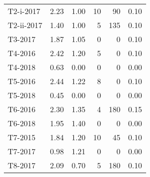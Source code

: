 \begin{tabular}{lrrrrr}
   T2-i-2017 &                2.23 &            1.00 &                 10 &                        90 &                      0.10 \\
  T2-ii-2017 &                1.40 &            1.00 &                  5 &                       135 &                      0.10 \\
     T3-2017 &                1.87 &            1.05 &                  0 &                         0 &                      0.10 \\
     T4-2016 &                2.42 &            1.20 &                  5 &                         0 &                      0.10 \\
     T4-2018 &                0.63 &            0.00 &                  0 &                         0 &                      0.00 \\
     T5-2016 &                2.44 &            1.22 &                  8 &                         0 &                      0.10 \\
     T5-2018 &                0.45 &            0.00 &                  0 &                         0 &                      0.00 \\
     T6-2016 &                2.30 &            1.35 &                  4 &                       180 &                      0.15 \\
     T6-2018 &                1.95 &            1.40 &                  0 &                         0 &                      0.00 \\
     T7-2015 &                1.84 &            1.20 &                 10 &                        45 &                      0.10 \\
     T7-2017 &                0.98 &            1.21 &                  0 &                         0 &                      0.00 \\
     T8-2017 &                2.09 &            0.70 &                  5 &                       180 &                      0.10 \\
\bottomrule
\end{tabular}
